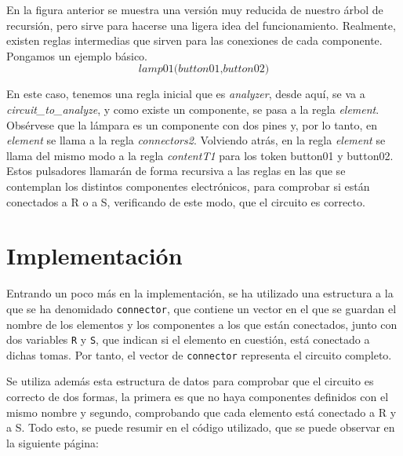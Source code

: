 \documentclass{article}
\begin{document}
En la figura anterior se muestra una versión muy reducida de nuestro árbol de recursión, pero sirve para hacerse una ligera idea del funcionamiento. Realmente, existen reglas intermedias que sirven para las conexiones de cada componente. Pongamos un ejemplo básico. $$\textit{lamp01(button01,button02)}$$

En este caso, tenemos una regla inicial que es \textit{analyzer}, desde aquí, se va a \textit{circuit\_to\_analyze}, y como existe un componente, se pasa a la regla \textit{element}. Obsérvese que la lámpara es un componente con dos pines y, por lo tanto, en \textit{element} se llama a la regla \textit{connectors2}. Volviendo atrás, en la regla \textit{element} se llama del mismo modo a la regla \textit{contentT1} para los token button01 y button02. Estos pulsadores llamarán de forma recursiva a las reglas en las que se contemplan los distintos componentes electrónicos, para comprobar si están conectados a R o a S, verificando de este modo, que el circuito es correcto.

\section{Implementación}
Entrando un poco más en la implementación, se ha utilizado una estructura a la que se ha denomidado \texttt{connector}, que contiene un vector en el que se guardan el nombre de los elementos y los componentes a los que están conectados, junto con dos variables \texttt{R} y \texttt{S}, que indican si el elemento en cuestión, está conectado a dichas tomas. Por tanto, el vector de \texttt{connector} representa el circuito completo.

Se utiliza además esta estructura de datos para comprobar que el circuito es correcto de dos formas, la primera es que no haya componentes definidos con el mismo nombre y segundo, comprobando que cada elemento está conectado a R y a S. Todo esto, se puede resumir en el código utilizado, que se puede observar en la siguiente página:

\newpage

\end{document}
